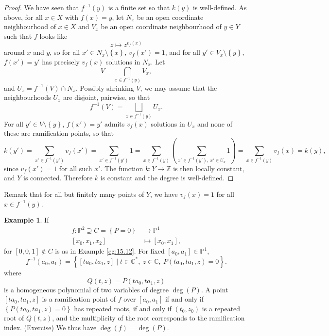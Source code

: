 \documentclass{article}
\newcommand{\Z}{\mathbb{Z}}
\newcommand{\C}{\mathbb{C}}
\renewcommand{\P}{\mathbb{P}}
\newcommand{\rb}[1]{\left( #1 \right)}
\renewcommand{\sb}[1]{\left[ #1 \right]}
\newcommand{\cb}[1]{\left\{ #1 \right\}}
\theoremstyle{definition}\newtheorem{definition}{Definition}[section]
\theoremstyle{definition}\newtheorem{notation}[definition]{Notation}
\theoremstyle{definition}\newtheorem{remark}[definition]{Remark}
\theoremstyle{definition}\newtheorem{example1}[definition]{Example}
\theoremstyle{definition}\newtheorem{fact}{Fact}
\theoremstyle{definition}\newtheorem{exercise}{Exercise}
\theoremstyle{definition}\newtheorem*{example2}{Example}
\begin{document}

\begin{proof}
We have seen that $ f^{-1}\rb{y} $ is a finite set so that $ k\rb{y} $ is well-defined. As above, for all $ x \in X $ with $ f\rb{x} = y $, let $ N_x $ be an open coordinate neighbourhood of $ x \in X $ and $ V_x $ be an open coordinate neighbourhood of $ y \in Y $ such that $ f $ looks like
$$ z \mapsto z^{v_f\rb{x}} $$
around $ x $ and $ y $, so for all $ x' \in N_x \setminus \cb{x} $, $ v_f\rb{x'} = 1 $, and for all $ y' \in V_x \setminus \cb{y} $, $ f\rb{x'} = y' $ has precisely $ v_f\rb{x} $ solutions in $ N_x $. Let
$$ V = \bigcap_{x \in f^{-1}\rb{y}} V_x, $$
and $ U_x = f^{-1}\rb{V} \cap N_x $. Possibly shrinking $ V $, we may assume that the neighbourhoods $ U_x $ are disjoint, pairwise, so that
$$ f^{-1}\rb{V} = \bigsqcup_{x \in f^{-1}\rb{y}} U_x. $$
For all $ y' \in V \setminus \cb{y} $, $ f\rb{x'} = y' $ admits $ v_f\rb{x} $ solutions in $ U_x $ and none of these are ramification points, so that
$$ k\rb{y'} = \sum_{x' \in f^{-1}\rb{y'}} v_f\rb{x'} = \sum_{x' \in f^{-1}\rb{y'}} 1 = \sum_{x \in f^{-1}\rb{y}} \rb{\sum_{x' \in f^{-1}\rb{y'}, \ x' \in U_x} 1} = \sum_{x \in f^{-1}\rb{y}} v_f\rb{x} = k\rb{y}, $$
since $ v_f\rb{x'} = 1 $ for all such $ x' $. The function $ k : Y \to \Z $ is then locally constant, and $ Y $ is connected. Therefore $ k $ is constant and the degree is well-defined.
\end{proof}

Remark that for all but finitely many points of $ Y $, we have $ v_f\rb{x} = 1 $ for all $ x \in f^{-1}\rb{y} $.

\begin{example1}
\label{eg:17.11}
If
\begin{align*}
f : \P^2 \supseteq C = \cb{P = 0} & \to \P^1 \\
\sb{x_0, x_1, x_2} & \mapsto \sb{x_0, x_1},
\end{align*}
for $ \sb{0, 0, 1} \notin C $ is as in Example \ref{eg:15.12}. For fixed $ \sb{a_0, a_1} \in \P^1 $,
$$ f^{-1}\rb{a_0, a_1} = \cb{\sb{ta_0, ta_1, z} \mid t \in \C^*, \ z \in \C, \ P\rb{ta_0, ta_1, z} = 0}. $$
where
$$ Q\rb{t, z} = P\rb{ta_0, ta_1, z} $$
is a homogeneous polynomial of two variables of degree $ \deg\rb{P} $. A point $ \sb{ta_0, ta_1, z} $ is a ramification point of $ f $ over $ \sb{a_0, a_1} $ if and only if $ \cb{P\rb{ta_0, ta_1, z} = 0} $ has repeated roots, if and only if $ \rb{t_0, z_0} $ is a repeated root of $ Q\rb{t, z} $, and the multiplicity of the root corresponds to the ramification index. (Exercise) We thus have $ \deg\rb{f} = \deg\rb{P} $.
\end{example1}
\end{document}
